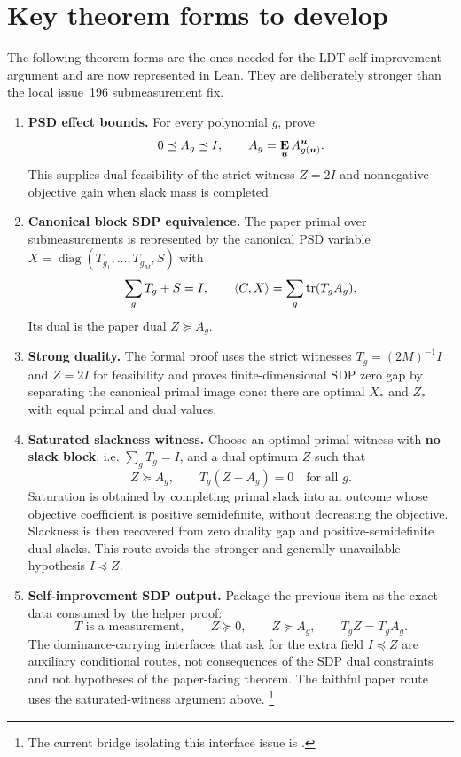 \documentclass[11pt]{article}
\begin{document}
\section{Key theorem forms to develop}

The following theorem forms are the ones needed for the LDT self-improvement
argument and are now represented in Lean.  They are deliberately stronger than
the local issue~196 submeasurement fix.

\begin{enumerate}
  \item \textbf{PSD effect bounds.}  For every polynomial $g$, prove
  \[
    0\preceq A_g\preceq I,
    \qquad
    A_g=\mathop{\bf E\/}_{\boldsymbol{u}} A^{\boldsymbol{u}}_{g(\boldsymbol{u})}.
  \]
  This supplies dual feasibility of the strict witness $Z=2I$ and nonnegative
  objective gain when slack mass is completed.

  \item \textbf{Canonical block SDP equivalence.}  The paper primal over
  submeasurements is represented by the canonical PSD variable
  $X=\operatorname{diag}(T_{g_1},\ldots,T_{g_M},S)$ with
  \[
    \sum_gT_g+S=I,
    \qquad
    \langle C,X\rangle=\sum_g\mathrm{tr}(T_gA_g).
  \]
  Its dual is the paper dual $Z\succeq A_g$.

  \item \textbf{Strong duality.}  The formal proof uses the strict witnesses
  $T_g=(2M)^{-1}I$ and $Z=2I$ for feasibility and proves finite-dimensional SDP
  zero gap by separating the canonical primal image cone: there are optimal
  $X_*$ and $Z_*$ with equal primal and dual values.

  \item \textbf{Saturated slackness witness.}  Choose an optimal primal witness
  with \textbf{no slack block}, i.e. $\sum_gT_g=I$, and a dual optimum $Z$ such
  that
  \[
    Z\succeq A_g,
    \qquad
    T_g(Z-A_g)=0
    \quad\text{for all }g.
  \]
  Saturation is obtained by completing primal slack into an outcome whose
  objective coefficient is positive semidefinite, without decreasing the
  objective.  Slackness is then recovered from zero duality gap and
  positive-semidefinite dual slacks.  This route avoids the stronger and
  generally unavailable hypothesis $I\preceq Z$.

  \item \textbf{Self-improvement SDP output.}  Package the previous item as the
  exact data consumed by the helper proof:
  \[
    T\text{ is a measurement},
    \qquad
    Z\succeq0,
    \qquad
    Z\succeq A_g,
    \qquad
    T_gZ=T_gA_g.
  \]
  The dominance-carrying interfaces that ask for the extra field $I\preceq Z$
  are auxiliary conditional routes, not consequences of the SDP dual constraints
  and not hypotheses of the paper-facing theorem.  The faithful paper route uses
  the saturated-witness argument above.%
  \footnote{The current bridge isolating this interface issue is
  .}
\end{enumerate}
\end{document}

